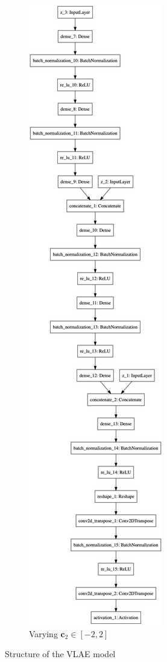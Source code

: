 \begin{figure}
\begin{subfigure}{.45\textwidth}
        \centering
        \includegraphics[height=.8\textheight]{images/vlae_decoder.png}
        \caption{Varying $\bm{c}_2 \in [-2, 2]$}
    \end{subfigure}
    \caption[VLAE structure]{Structure of the VLAE model}
    \label{fig:vlae_structure}
\end{figure}

